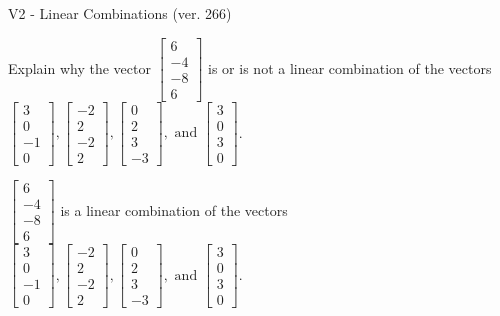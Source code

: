 \begin{exercise}
  \begin{exerciseTitle}V2 - Linear Combinations (ver. 266)\end{exerciseTitle}
  \begin{exerciseStatement}
    Explain why the vector \(\left[\begin{array}{c}
6 \\
-4 \\
-8 \\
6
\end{array}\right]\)  is or is not a linear 
	combination of the vectors \(\left[\begin{array}{c}
3 \\
0 \\
-1 \\
0
\end{array}\right] , \left[\begin{array}{c}
-2 \\
2 \\
-2 \\
2
\end{array}\right] , \left[\begin{array}{c}
0 \\
2 \\
3 \\
-3
\end{array}\right] , \text{ and } \left[\begin{array}{c}
3 \\
0 \\
3 \\
0
\end{array}\right]\).
	


  \end{exerciseStatement}
  \begin{exerciseAnswer}
   \(\left[\begin{array}{c}
6 \\
-4 \\
-8 \\
6
\end{array}\right]\) 
  	 is  
	a linear combination of the vectors \(\left[\begin{array}{c}
3 \\
0 \\
-1 \\
0
\end{array}\right] , \left[\begin{array}{c}
-2 \\
2 \\
-2 \\
2
\end{array}\right] , \left[\begin{array}{c}
0 \\
2 \\
3 \\
-3
\end{array}\right] , \text{ and } \left[\begin{array}{c}
3 \\
0 \\
3 \\
0
\end{array}\right]\).


\end{exerciseAnswer}
\end{exercise}
